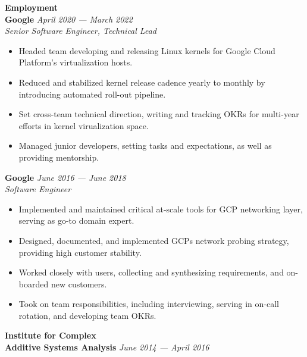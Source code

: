 \documentclass[11pt,a4paper,sans]{article}
\newcommand{\cvcolor}[1]{{\color{MidnightBlue}#1}}
\renewcommand{\section}[1]{
  \cvcolor{\noindent \textbf{\LARGE #1}}
  \vspace{.5em}\\
}
\begin{document}
\hfill\vline\hfill
\begin{minipage}[t]{0.6\linewidth}
\section{Employment}
\textbf{Google} \hfill \textsl{April 2020 --- March 2022}\\
\textsl{Senior Software Engineer, Technical Lead}
\nopagebreak
\begin{itemize}
  \item Headed team developing and releasing Linux kernels for Google Cloud
    Platform's virtualization hosts.
  \item Reduced and stabilized kernel release cadence yearly to monthly by
    introducing automated roll-out pipeline.
  \item Set cross-team technical direction, writing and tracking OKRs for
    multi-year efforts in kernel virualization space.
  \item Managed junior developers, setting tasks and expectations, as well as
    providing mentorship.
\end{itemize}
\vspace{1em}
\textbf{Google} \hfill \textsl{June 2016 --- June 2018}\\
\textsl{Software Engineer}
\nopagebreak
\begin{itemize}
  \item Implemented and maintained critical at-scale tools for GCP
    networking layer, serving as go-to domain expert.
  \item Designed, documented, and implemented GCPs network probing strategy,
    providing high customer stability.
  \item Worked closely with users, collecting and synthesizing requirements,
    and on-boarded new customers.
  \item Took on team responsibilities, including interviewing, serving in
    on-call rotation, and developing team OKRs.
\end{itemize}
\vspace{1em}
\textbf{Institute for Complex \\ Additive Systems Analysis} \hfill \textsl{June 2014 --- April 2016}\\

\end{minipage}
\end{document}

